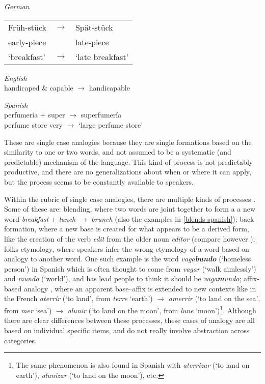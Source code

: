 \begin{exe}
    \ex \textit{German}\\
    \begin{tabular}[t]{lcl}
      Früh-stück & $\rightarrow$& Spät-stück\\
      early-piece &&late-piece\\
      `breakfast' &$\rightarrow$& `late breakfast'\\
    \end{tabular}
    \ex \textit{English}\\
    handicaped \& capable  $\rightarrow$ handicapable

    \ex \label{blends-spanish} \textit{Spanish}\\
    \gll perfumería  + super $\rightarrow$ superfumería \\
    {perfume store} {} very $\rightarrow$ {`large perfume store'}\\

\end{exe}


These are single case analogies because they are single formations based on the similarity to one or two words, and not assumed to be a systematic (and predictable) mechanism of the language. This kind of process is not predictably productive, and there are no generalizations about when or where it can apply, but the process seems to be constantly available to speakers. 

Within the rubric of single case analogies, there are multiple kinds of processes \autocite[p. 278]{Anderson.2015}. Some of these are: blending, where two words are joint together to form a a new word \textit{breakfast} + \textit{lunch} $\rightarrow$ \textit{brunch} (also the examples in \ref{blends-spanish}); back formation, where a new base is created for what appears to be a derived form, like the creation of the verb \textit{edit} from the older noun \textit{editor} (compare however \textcite{vanMarle.1985, Becker.1993}); folks etymology, where speakers infer the wrong etymology of a word based on analogy to another word. One such example is the word \textit{vaga\textbf{bundo}} (`homeless person') in Spanish which is often thought to come from \textit{vagar} (`walk aimlessly') and \textit{mundo} (`world'), and has lead people to think it should be \textit{vaga\textbf{m}undo}; affix-based analogy \autocite{Kilani-Schoch.2005}, where an apparent base--affix is extended to new contexts like in the French \textit{aterrir} (`to land', from \textit{terre} `earth') $\rightarrow$ \textit{amerrir} (`to land on the sea', from \textit{mer} `sea') $\rightarrow$ \textit{alunir} (`to land on the moon', from \textit{lune} `moon')\footnote{The same phenomenon is also found in Spanish with \textit{aterrizar} (`to land on earth'), \textit{alunizar} (`to land on the moon'), etc.}. Although there are clear differences between these processes, these cases of analogy are all based on individual specific items, and do not really involve abstraction across categories.

